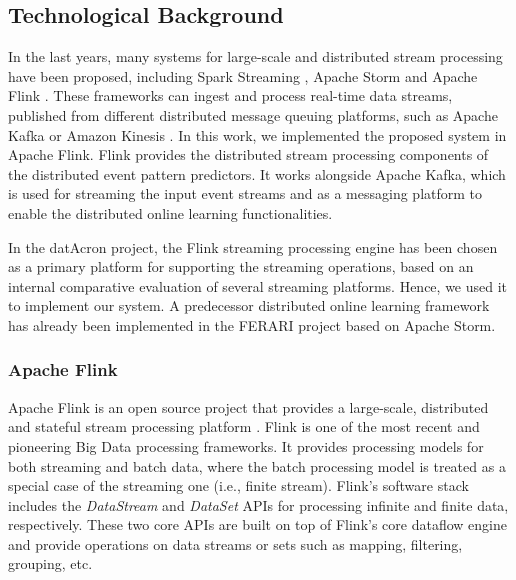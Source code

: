 \subsection{Technological Background}

\par In the last years, many systems for large-scale and distributed stream processing have been proposed, including Spark Streaming \cite{Spark},  Apache Storm \cite{Storm} and Apache Flink \cite{Flink}. These frameworks can ingest and process real-time data streams, published from different distributed message queuing platforms, such as Apache Kafka \cite{Kafka} or  Amazon Kinesis \cite{Kinesis}. In this work, we implemented the proposed system in Apache Flink. Flink provides the distributed stream processing components of the distributed event pattern predictors. It works alongside Apache Kafka,
which is used for streaming the input event streams and as a messaging platform to enable the distributed online learning functionalities.


\par In the datAcron project, the Flink streaming processing engine has been chosen as a primary platform for supporting the streaming operations, based on an internal comparative evaluation of several streaming platforms. Hence, we used it to implement our system. A predecessor distributed online learning framework has already been implemented in the FERARI project \cite{flouris2016ferari} based on Apache Storm.



\subsubsection*{Apache Flink}

\par Apache Flink is an open source project that provides a large-scale, distributed and stateful stream processing platform \cite{carbone2015apache}. Flink is one of the most recent and pioneering Big Data processing frameworks. It provides processing models for both streaming and batch data, where the batch processing model is treated as a special case of the streaming one (i.e., finite stream). Flink's software stack includes the \textit{DataStream} and \textit{DataSet} APIs for processing infinite and finite data, respectively. These two core APIs are built on top of Flink's core dataflow engine and provide operations on data streams or sets such as mapping, filtering, grouping, etc.

